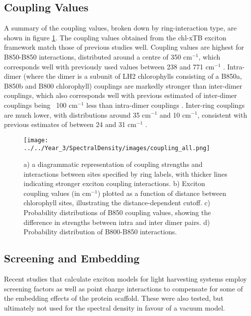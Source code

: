 \subsection{Coupling Values}
\label{subsec:coupling_values}

A summary of the coupling values, broken down by ring-interaction type, are shown
in figure \ref{fig:coupling_all}. The coupling values obtained from the chl-xTB 
exciton framework match those of previous studies well. Coupling values are highest 
for B850-B850 interactions, distributed around a centre of 350 $\text{cm}^{-1}$,
which corresponds well with previously used values between 238 and 771 $\text{cm}^{-1}$ \cite{Cogdell2006}.
Intra-dimer (where the dimer is a subunit of LH2 chlorophylls consisting of a B850a,
B850b and B800 chlorophyll) couplings are markedly stronger than inter-dimer couplings, 
which also corresponds well with previous estimated of inter-dimer couplings being
~100 $\text{cm}^{-1}$ less than intra-dimer couplings \cite{Koolhaas1997, Jimenez1996, Chachisvilis1997, Scholes2000}. 
Inter-ring couplings are much lower, with distributions around 35 $\text{cm}^{-1}$
and 10 $\text{cm}^{-1}$, consistent with previous estimates of between 24 and 31 
$\text{cm}^{-1}$ \cite{Krueger1998}.

\begin{figure}
    \centering
    \texttt{[image: ../../Year\_3/SpectralDensity/images/coupling\_all.png]}
    \caption{a) a diagrammatic representation of coupling strengths and interactions
    between sites specified by ring labels, with thicker lines indicating stronger
    exciton coupling interactions. b) Exciton coupling values (in $\text{cm}^{-1}$)
    plotted as a function of distance between chlorophyll sites, illustrating the
    distance-dependent cutoff. c) Probability distributions of B850 coupling values,
    showing the difference in strengths between intra and inter dimer pairs. d) 
    Probability distribution of B800-B850 interactions.}
    \label{fig:coupling_all}
\end{figure}

\subsection{Screening and Embedding}
\label{subsec:screening}

Recent studies that calculate exciton models for light harvesting systems employ
screening factors as well as point charge interactions to compensate for some of
the embedding effects of the protein scaffold. These were also tested, but ultimately
not used for the spectral density in favour of a vacuum model.

